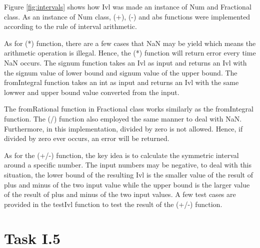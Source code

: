 \documentclass{article}
\begin{document}
\begin{normalsize}
  Figure \ref{fig:intervals} shows how Ivl was made an instance of Num and
  Fractional class. As an instance of Num class, (+), (-) and abs functions were implemented according to the rule of interval arithmetic.

  As for (*) function, there are a few cases that NaN may be yield which means the arithmetic operation is illegal. Hence, the (*) function will return error every time NaN occurs. The signum function takes an Ivl as input and returns an Ivl with the signum value of lower bound and signum value of the upper bound. The
  fromIntegral function takes an int as input and returns an Ivl with the same
  lowwer and upper bound value converted from the input.

  The fromRational function in Fractional class works similarly as the
  fromIntegral function. The (/) function also employed the same manner to deal with NaN. Furthermore, in this implementation, divided by zero is not allowed.
  Hence, if divided by zero ever occurs, an error will be returned.

  As for the (+/-) function, the key idea is to calculate the symmetric interval around a specific number. The input numbers may be negative, to deal with this situation, the lower bound of the resulting Ivl is the smaller value of the result of plus and minus of the two input value while the upper bound is the larger value of the result of plus and minus of the two input values. A few
  test cases are provided in the testIvl function to test the result of the (+/-)
  function. 

  \section{Task I.5}

  \begin{figure}[H]


\end{figure}
\end{normalsize}
\end{document}
